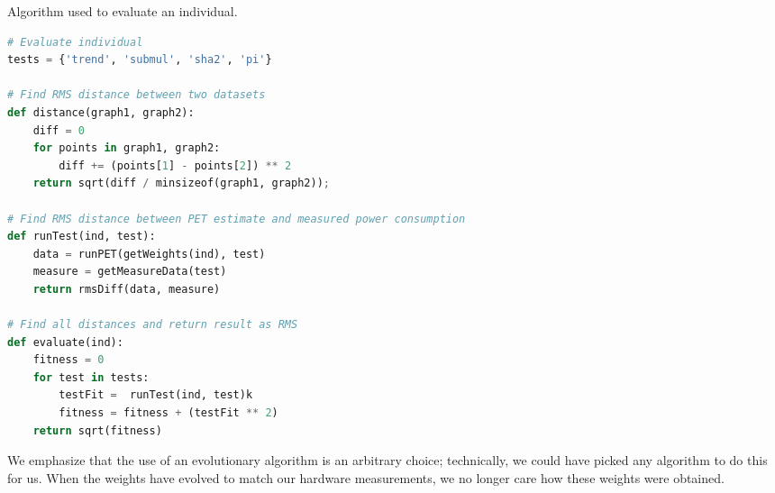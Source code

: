 \begin{algorithm}
\caption{Algorithm used to evaluate an individual.}
\label{lst:ga-eval-algorithm}
\begin{lstlisting}[language=python,style=algo]
# Evaluate individual
tests = {'trend', 'submul', 'sha2', 'pi'}

# Find RMS distance between two datasets
def distance(graph1, graph2):
    diff = 0
    for points in graph1, graph2:
        diff += (points[1] - points[2]) ** 2
    return sqrt(diff / minsizeof(graph1, graph2));

# Find RMS distance between PET estimate and measured power consumption
def runTest(ind, test):
    data = runPET(getWeights(ind), test)
    measure = getMeasureData(test)
    return rmsDiff(data, measure)

# Find all distances and return result as RMS
def evaluate(ind):
    fitness = 0
    for test in tests:
        testFit =  runTest(ind, test)k
        fitness = fitness + (testFit ** 2)
    return sqrt(fitness)
\end{lstlisting}
\end{algorithm}




We emphasize that the use of an evolutionary algorithm is an arbitrary choice;
technically, we could have picked any algorithm to do this for us. When the
weights have evolved to match our hardware measurements, we no longer care how
these weights were obtained.
